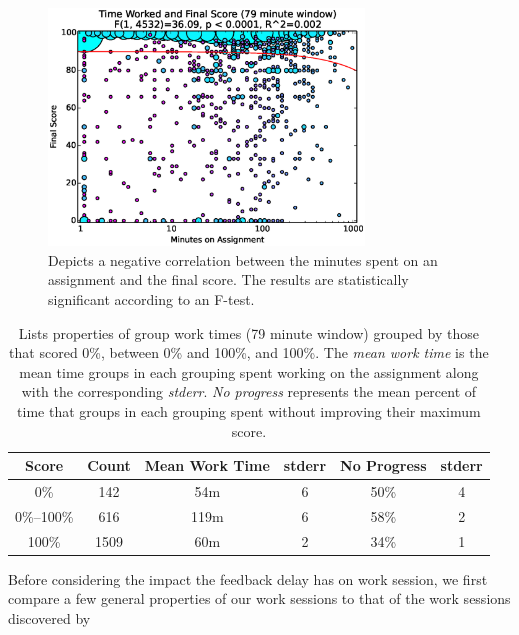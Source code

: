 \begin{figure}[!t]
\centering \includegraphics[width=3.3in]{graphs/Time_Worked_and_Final_Score_(79_minute_window).eps}
\caption{Depicts a negative correlation between the minutes spent on an
  assignment and the final score. The results are statistically significant
  according to an F-test.}
\end{figure}

\begin{table}
\centering
\begin{tabular}{|c||c|c|c|c|c|} \hline
Score & Count & Mean Work Time & stderr & No Progress & stderr \\ \hline \hline
0\% & 142 & 54m & 6 & 50\% & 4 \\ \hline
0\%--100\% & 616 & 119m & 6 & 58\% & 2 \\ \hline
100\% & 1509 & 60m & 2 & 34\% & 1 \\ \hline
\end{tabular}
\caption{Lists properties of group work times (79 minute window) grouped by
  those that scored 0\%, between 0\% and 100\%, and 100\%. The \emph{mean work
    time} is the mean time groups in each grouping spent working on the
  assignment along with the corresponding \emph{stderr}. \emph{No progress}
  represents the mean percent of time that groups in each grouping spent
  without improving their maximum score.}
\end{table}

Before considering the impact the feedback delay has on work session, we first
compare a few general properties of our work sessions to that of the work
sessions discovered by \spacco[.]{}

